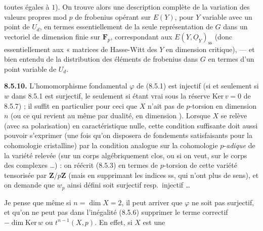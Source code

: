 \documentclass[11pt,a4paper]{article}
\begin{document}

toutes égales à $1$). On trouve alors une description complète de la variation
des valeurs propres mod $p$ de frobenius opérant sur $E(Y)$, pour $Y$ variable
avec un point de $U_{d}$, en termes essentiellement de la seule représentation
de $G$ dans un vectoriel de dimension finie sur $\mathbf{F}_{p}$, correspondant
aux $E(Y, \underline{O}_{Y})_{\mathrm{ss}}$ (donc essentiellement aux « matrices
de Hasse-Witt des $Y$ en dimension critique), --- et bien entendu de la
distribution des éléments de frobenius dans $G$ en termes d'un point variable de
$U_{d}$.

\textbf{8.5.10.} L'homomorphisme fondamental $\varphi$ de (8.5.1) est
 injectif  (si et seulement si $w$
dans 8.5.1 est  surjectif,  le seulement si étant vrai
sous la réserve $\mathrm{Ker}\, v = 0$ de 8.5.7) ; il suffit en particulier pour
ceci que $X$ n'ait pas de $p$-torsion en dimension $n$  (ou ce qui revient au même par dualité, en dimension
).
Lorsque $X$ se relève (avec sa polarisation) en caractéristique nulle, cette
condition suffisante doit aussi pouvoir s'exprimer (une fois qu'on disposera de
fondements satisfaisants pour la cohomologie cristalline) par la condition
analogue sur  la cohomologie $p$-\emph{adique} de la variété
relevée (sur un corps algébriquement clos, ou si on veut, sur le corps des
complexes \ldots{}) : on réécrit (8.5.3) en termes de $p$-torsion de cette
variété tensorisée par $\mathbf{Z}/p\mathbf{Z}$ (mais en supprimant les indices
ss, qui n'ont plus de sens), et on demande que $w_{p}$ ainsi défini soit
surjectif resp.\ injectif \ldots{}

Je pense que même si $n = \dim X = 2$, il peut arriver que $\varphi$ ne
soit pas surjectif, et qu'on ne peut pas dans l'inégalité (8.5.6) supprimer le
terme correctif $- \dim \mathrm{Ker}\, w$ ou $t^{n-1}(X, p)$. En effet, si $X$
est une
\end{document}
